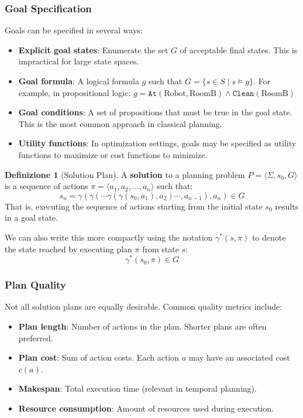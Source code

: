 \documentclass[11pt,a4paper]{article}
\theoremstyle{definition}
\newtheorem{definition}{Definizione}[section]
\theoremstyle{plain}
\theoremstyle{remark}
\begin{document}
\subsubsection{Goal Specification}

Goals can be specified in several ways:

\begin{itemize}
    \item \textbf{Explicit goal states}: Enumerate the set $G$ of acceptable final states. This is impractical for large state spaces.
    
    \item \textbf{Goal formula}: A logical formula $g$ such that $G = \{s \in S \mid s \models g\}$. For example, in propositional logic: $g = \texttt{At}(\text{Robot}, \text{RoomB}) \land \texttt{Clean}(\text{RoomB})$
    
    \item \textbf{Goal conditions}: A set of propositions that must be true in the goal state. This is the most common approach in classical planning.
    
    \item \textbf{Utility functions}: In optimization settings, goals may be specified as utility functions to maximize or cost functions to minimize.
\end{itemize}

\begin{definition}[Solution Plan]
A \textbf{solution} to a planning problem $P = \langle \Sigma, s_0, G \rangle$ is a sequence of actions $\pi = \langle a_1, a_2, \dots, a_n \rangle$ such that:
\[
s_n = \gamma(\gamma(\cdots \gamma(\gamma(s_0, a_1), a_2) \cdots, a_{n-1}), a_n) \in G
\]
That is, executing the sequence of actions starting from the initial state $s_0$ results in a goal state.
\end{definition}

We can also write this more compactly using the notation $\gamma^*(s, \pi)$ to denote the state reached by executing plan $\pi$ from state $s$:
\[
\gamma^*(s_0, \pi) \in G
\]

\subsubsection{Plan Quality}

Not all solution plans are equally desirable. Common quality metrics include:

\begin{itemize}
    \item \textbf{Plan length}: Number of actions in the plan. Shorter plans are often preferred.
    \item \textbf{Plan cost}: Sum of action costs. Each action $a$ may have an associated cost $c(a)$.
    \item \textbf{Makespan}: Total execution time (relevant in temporal planning).
    \item \textbf{Resource consumption}: Amount of resources used during execution.
\end{itemize}
\end{document}
